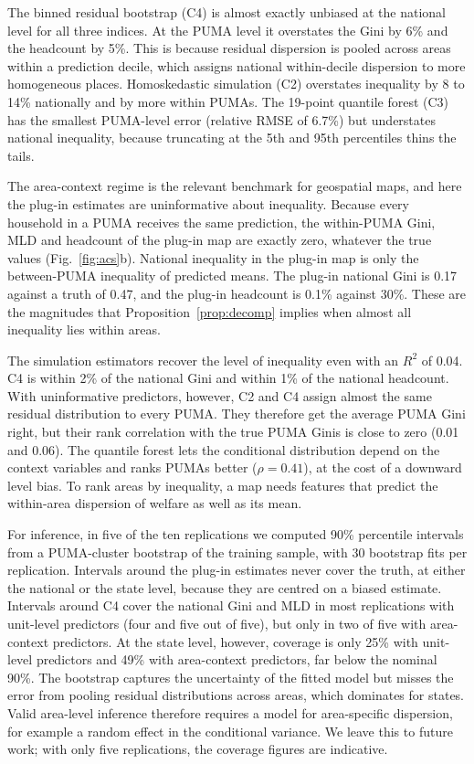 \documentclass[pdflatex,sn-mathphys-ay]{sn-jnl}
\theoremstyle{thmstyleone}%
\theoremstyle{thmstyletwo}%
\theoremstyle{thmstylethree}%
\begin{document}
The binned residual bootstrap (C4) is almost exactly unbiased at the national level for all three indices. At the PUMA level it overstates the Gini by 6\% and the headcount by 5\%. This is because residual dispersion is pooled across areas within a prediction decile, which assigns national within-decile dispersion to more homogeneous places. Homoskedastic simulation (C2) overstates inequality by 8 to 14\% nationally and by more within PUMAs. The 19-point quantile forest (C3) has the smallest PUMA-level error (relative RMSE of 6.7\%) but understates national inequality, because truncating at the 5th and 95th percentiles thins the tails.

The area-context regime is the relevant benchmark for geospatial maps, and here the plug-in estimates are uninformative about inequality. Because every household in a PUMA receives the same prediction, the within-PUMA Gini, MLD and headcount of the plug-in map are exactly zero, whatever the true values (Fig.~\ref{fig:acs}b). National inequality in the plug-in map is only the between-PUMA inequality of predicted means. The plug-in national Gini is 0.17 against a truth of 0.47, and the plug-in headcount is 0.1\% against 30\%. These are the magnitudes that Proposition~\ref{prop:decomp} implies when almost all inequality lies within areas.

The simulation estimators recover the level of inequality even with an $R^2$ of 0.04. C4 is within 2\% of the national Gini and within 1\% of the national headcount. With uninformative predictors, however, C2 and C4 assign almost the same residual distribution to every PUMA. They therefore get the average PUMA Gini right, but their rank correlation with the true PUMA Ginis is close to zero (0.01 and 0.06). The quantile forest lets the conditional distribution depend on the context variables and ranks PUMAs better ($\rho=0.41$), at the cost of a downward level bias. To rank areas by inequality, a map needs features that predict the within-area dispersion of welfare as well as its mean.

For inference, in five of the ten replications we computed 90\% percentile intervals from a PUMA-cluster bootstrap of the training sample, with 30 bootstrap fits per replication. Intervals around the plug-in estimates never cover the truth, at either the national or the state level, because they are centred on a biased estimate. Intervals around C4 cover the national Gini and MLD in most replications with unit-level predictors (four and five out of five), but only in two of five with area-context predictors. At the state level, however, coverage is only 25\% with unit-level predictors and 49\% with area-context predictors, far below the nominal 90\%. The bootstrap captures the uncertainty of the fitted model but misses the error from pooling residual distributions across areas, which dominates for states. Valid area-level inference therefore requires a model for area-specific dispersion, for example a random effect in the conditional variance. We leave this to future work; with only five replications, the coverage figures are indicative.
\end{document}
